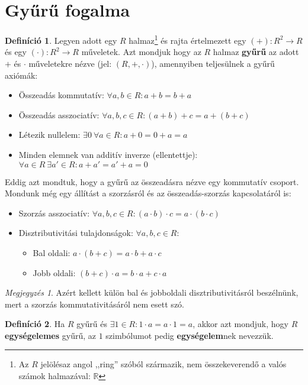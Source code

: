 \documentclass[12pt]{book}
\theoremstyle{plain} %
\theoremstyle{definition} %
\newtheorem{defi/}{Definíció}[section]
\newenvironment{defi}
  {\renewcommand{\qedsymbol}{$\clubsuit$}%
   \pushQED{\qed}\begin{defi/}}
  {\popQED\end{defi/}}
\theoremstyle{remark}
\newtheorem*{mj}{Megjegyzés}
\renewcommand\qedsymbol{$\blacksquare$}
\numberwithin{equation}{section}  %
\begin{document}
	\section{Gyűrű fogalma}
	\begin{defi}
		Legyen adott egy $R$ halmaz\footnote{Az $R$ jelölésaz angol ,,ring'' szóból származik, nem összekeverendő a valós számok halmazával: $\mathbb{R}$} és rajta értelmezett egy $(+)\colon R^2\to R$ és egy $(\cdot)\colon R^2\to R$ műveletek. Azt mondjuk hogy az $R$ halmaz \textbf{gyűrű} az adott $+$ és $\cdot$ műveletekre nézve (jel: $(R,+,\cdot)$), amennyiben teljesülnek a gyűrű axiómák:
		\begin{itemize}
			\item Összeadás kommutatív: $\forall a,b\in R\colon a+b=b+a$
			\item Összeadás asszociatív: $\forall a,b,c\in R\colon (a+b)+c=a+(b+c)$
			\item Létezik nullelem: $\exists 0\ \forall a\in R\colon a+0=0+a=a$
			\item Minden elemnek van additív inverze (ellentettje): $\forall a\in R\ \exists a'\in R\colon a+a'=a'+a=0$
		\end{itemize}
		Eddig azt mondtuk, hogy a gyűrű az összeadásra nézve egy kommutatív csoport. Mondunk még egy állítást a szorzásról és az összeadás-szorzás kapcsolatáról is:
		\begin{itemize}
			\item Szorzás asszociatív: $\forall a,b,c\in R\colon (a\cdot b)\cdot c=a\cdot (b\cdot c)$
			\item 
			{
				Disztributivitási tulajdonságok: $\forall a,b,c\in R\colon$
				\begin{itemize}
					\item Bal oldali: $a \cdot (b+c) = a \cdot b + a \cdot c$
					\item Jobb oldali: $(b+c)\cdot a = b \cdot a + c \cdot a $
				\end{itemize}
			}
		\end{itemize}
	\end{defi}
	\begin{mj}
		Azért kellett külön bal és jobboldali disztributivitásról beszélnünk, mert a szorzás kommutativitásáról nem esett szó.
	\end{mj}
	\begin{defi}
		Ha $R$ gyűrű és $\exists 1\in R\colon 1 \cdot a = a \cdot 1 = a$, akkor azt mondjuk, hogy $R$ \textbf{egységelemes} gyűrű, az $1$ szimbólumot pedig \textbf{egységelem}nek nevezzük.
	\end{defi}
\end{document}
